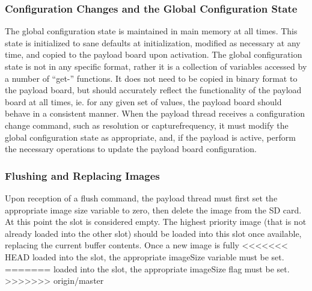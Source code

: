 \documentclass{article}
\begin{document}
\subsubsection{Configuration Changes and the Global Configuration State}
The global configuration state is maintained in main memory at all times. 
This state is initialized to sane
defaults at initialization, modified as necessary at any time, and copied
to the payload board upon activation. 
The global configuration state is not in any specific format, rather it is
a collection of variables accessed by a number of ``get-'' functions. It does
not need to be copied in binary format to the payload board, but should
accurately reflect the functionality of the payload board at all times, ie. for
any given set of values, the payload board should behave in a consistent manner.
When the payload thread receives a configuration change command, such as resolution
or capturefrequency, it must modify the global configuration state as
appropriate, and, if the payload is active, perform the necessary operations
to update the payload board configuration.

\subsubsection{Flushing and Replacing Images}
Upon reception of a flush command, the payload thread must first set the
appropriate image size variable to zero, then delete the image
from the SD card. At this point the slot is
considered empty. The highest priority image (that is not already loaded into
the other slot) should be loaded into this slot
once available, replacing the current buffer contents. Once a new image is fully
<<<<<<< HEAD
loaded into the slot, the appropriate imageSize variable must be set.
=======
loaded into the slot, the appropriate imageSize flag must be set.
>>>>>>> origin/master
\end{document}
